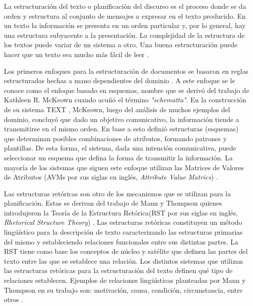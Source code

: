     La estructuración del texto o planificación del discurso es el proceso donde se da orden y estructura al conjunto de mensajes a expresar en el texto producido. En un texto la información se presenta en un orden particular 
y, por lo general, hay una estructura subyacente a la presentación. La complejidad de la estructura de los textos puede variar de un sistema a otro. Una buena estructuración puede hacer que un texto sea mucho más fácil 
de leer .

    Los primeros enfoques para la estructuración de documentos se basaron en reglas estructuradas hechas a mano dependientes del dominio . A este enfoque se le conoce como el enfoque basado en esquemas, nombre que 
se deriv\'o del trabajo de Kathleen R. McKeown  cuando acu\~n\'o el t\'ermino \textit{"schematta"}. En la construcci\'on de su sistema TEXT , McKeown, luego del análisis de muchos 
ejemplos del dominio, concluyó que dado un objetivo comunicativo, la información tiende a transmitirse en el mismo orden. En base a esto defini\'o estructuras (esquemas) que determinan posibles combinaciones de atributos, formando patrones 
y plantillas. De esta forma, el sistema, dada una intenci\'on comunicativa, puede seleccionar un esquema que defina la forma de transmitir la información. La mayor\'ia de los sistemas que siguen este enfoque utilizan 
las Matrices de Valores de Atributos (AVMs por sus siglas en inglés, \emph{Attribute Value Matrics}) .

    Las estructuras ret\'oricas son otro de los mecanismos que se utilizan para la planificación. Estas se derivan del trabajo de Mann y Thompson quienes introdujeron la Teor\'ia de la Estructura Ret\'orica(RST por
sus siglas en inglés, \emph{Rhetorical Structure Theory}) . Las estructuras ret\'oricas constituyen un m\'etodo lingüístico para la descripci\'on de texto caracterizando las estructuras primarias del mismo y estableciendo 
relaciones funcionales entre sus distintas partes. La RST tiene como base los conceptos de n\'ucleo y sat\'elite que definen las partes del texto entre las que se establece una relaci\'on. Los distintos sistemas que utilizan las estructuras ret\'oricas 
para la estructuraci\'on del texto definen qué tipo de relaciones establecen. Ejemplos de relaciones lingüísticas planteadas por Mann y Thompson en su trabajo son: motivaci\'on, causa, condici\'on, circunstancia, entre otros . 

